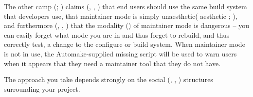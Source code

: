 The other camp ({\MjQ{}}; {\MfQ{}}) claims ({\MaQ{}}, {\MbQ{}}, {\McQ{}}) that 
end users should use the same build system that 
developers use, that maintainer mode is simply 
unaesthetic( aesthetic {\MaQ{}}; {\MaQ{}}),
and furthermore ({\McQ{}}, {\MbQ{}}, {\MaQ{}}) that the modality ({\MbQ{}}) of 
maintainer mode is dangerous -- you can easily forget what mode you are 
in and thus forget to rebuild, and thus correctly test, a change to 
the configure or build system. When maintainer mode is not in use,
the Automake-supplied missing script will be used to warn users 
when it appears that they need a maintainer tool that they do not have. 


The approach you take depends strongly on the 
social ({\MbQ{}}, {\MaQ{}}, {\McQ{}}) structures surrounding your project. 

